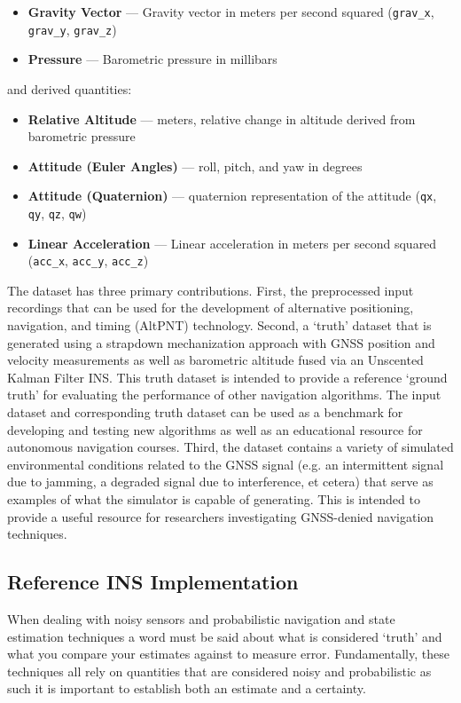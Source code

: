 \documentclass[Afour,sageh,times]{sagej}
\begin{document}
\begin{itemize}
  \item \textbf{Gravity Vector} --- Gravity vector in meters per second squared (\verb|grav_x|, \verb|grav_y|, \verb|grav_z|)
  \item \textbf{Pressure} --- Barometric pressure in millibars
\end{itemize} and derived quantities:\begin{itemize}
  \item \textbf{Relative Altitude} --- meters, relative change in altitude derived from barometric pressure
  \item \textbf{Attitude (Euler Angles)} --- roll, pitch, and yaw in degrees
  \item \textbf{Attitude (Quaternion)} --- quaternion representation of the attitude (\verb|qx|, \verb|qy|, \verb|qz|, \verb|qw|)
  \item \textbf{Linear Acceleration} --- Linear acceleration in meters per second squared (\verb|acc_x|, \verb|acc_y|, \verb|acc_z|)
\end{itemize}

The dataset has three primary contributions. First, the preprocessed input recordings that can be used for the development of alternative positioning, navigation, and timing (AltPNT) technology. Second, a `truth' dataset that is generated using a strapdown mechanization approach with GNSS position and velocity measurements as well as barometric altitude fused via an Unscented Kalman Filter INS. This truth dataset is intended to provide a reference `ground truth' for evaluating the performance of other navigation algorithms. The input dataset and corresponding truth dataset can be used as a benchmark for developing and testing new algorithms as well as an educational resource for autonomous navigation courses. Third, the dataset contains a variety of simulated environmental conditions related to the GNSS signal (e.g. an intermittent signal due to jamming, a degraded signal due to interference, et cetera) that serve as examples of what the simulator is capable of generating. This is intended to provide a useful resource for researchers investigating GNSS-denied navigation techniques.

\subsection{Reference INS Implementation}
When dealing with noisy sensors and probabilistic navigation and state estimation techniques a word must be said about what is considered `truth' and what you compare your estimates against to measure error. Fundamentally, these techniques all rely on quantities that are considered noisy and probabilistic as such it is important to establish both an estimate and a certainty. 
\end{document}
